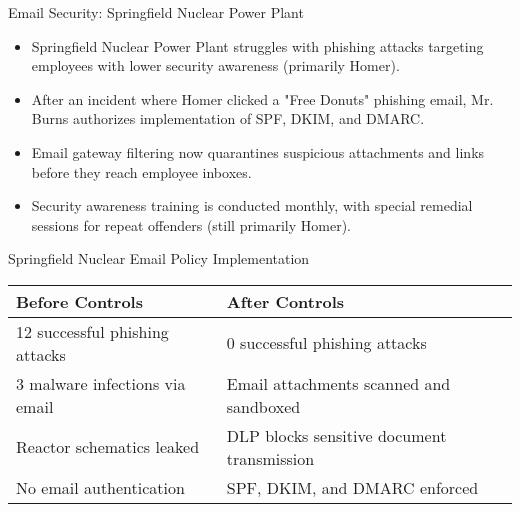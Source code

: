 \documentclass{beamer}
\begin{document}
\begin{frame}{Email Security: Springfield Nuclear Power Plant}
\begin{itemize}
\item Springfield Nuclear Power Plant struggles with phishing attacks targeting employees with lower security awareness (primarily Homer).
\item After an incident where Homer clicked a "Free Donuts" phishing email, Mr. Burns authorizes implementation of SPF, DKIM, and DMARC.
\item Email gateway filtering now quarantines suspicious attachments and links before they reach employee inboxes.
\item Security awareness training is conducted monthly, with special remedial sessions for repeat offenders (still primarily Homer).
\end{itemize}

\begin{block}{Springfield Nuclear Email Policy Implementation}
\scriptsize
\begin{tabular}{ll}
\textbf{Before Controls} & \textbf{After Controls} \\
\hline
12 successful phishing attacks & 0 successful phishing attacks \\
3 malware infections via email & Email attachments scanned and sandboxed \\
Reactor schematics leaked & DLP blocks sensitive document transmission \\
No email authentication & SPF, DKIM, and DMARC enforced \\
\end{tabular}
\end{block}

\end{frame}
\end{document}
